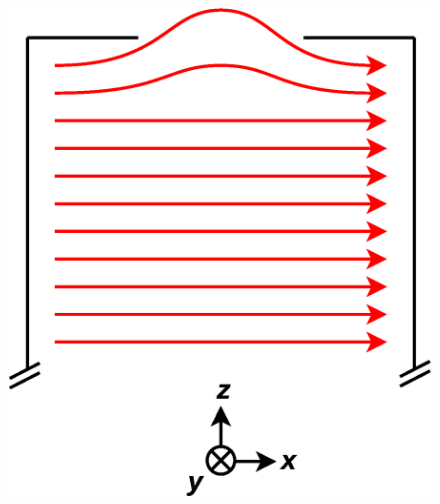 \documentclass{beamer}
\begin{document}
\begin{frame}
\begin{columns}[b]
    \begin{column}{0.5\textwidth}
    \begin{figure}
    \includegraphics[width=\textwidth]
    {figures/field_endcap.eps}
    \end{figure}
    \vspace{0pt}
    \end{column}
    
\end{columns}

\end{frame}

%
%
\end{document}
